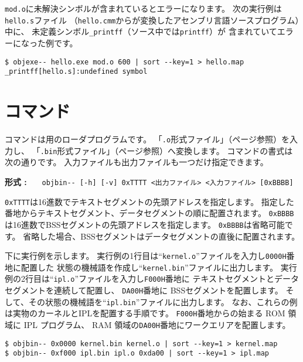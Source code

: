 \verb/mod.o/に未解決シンボルが含まれているとエラーになります。
次の実行例は\verb/hello.s/ファイル
（\verb/hello.cmm/から\cmmc が変換したアセンブリ言語ソースプログラム）中に、
未定義シンボル\verb/_printff/（\cmm ソース中では\verb/printff/）が
含まれていてエラーになった例です。

\begin{mylist}
\begin{verbatim}
$ objexe-- hello.exe mod.o 600 | sort --key=1 > hello.map
_printff[hello.s]:undefined symbol
\end{verbatim}
\end{mylist}

\section{{\objbin}コマンド}

{\objbin}コマンドは{\tac}用のローダプログラムです。
「\verb/.o/形式ファイル」（\pageref{app:oformat}ページ参照）を入力し、
「\verb/.bin/形式ファイル」（\pageref{app:bformat}ページ参照）へ変換します。
{\objbin}コマンドの書式は次の通りです。
入力ファイルも出力ファイルも一つだけ指定できます。

\begin{flushleft}
{\bf 形式 : }~~~\verb/objbin-- [-h] [-v] 0xTTTT <出力ファイル> <入力ファイル> [0xBBBB]/
\end{flushleft}

\verb/0xTTTT/は16進数でテキストセグメントの先頭アドレスを指定します。
指定した番地からテキストセグメント、データセグメントの順に配置されます。
\verb/0xBBBB/は16進数でBSSセグメントの先頭アドレスを指定します。
\verb/0xBBBB/は省略可能です。
省略した場合、BSSセグメントはデータセグメントの直後に配置されます。

下に実行例を示します。
実行例の1行目は``\verb/kernel.o/''ファイルを入力し\verb/0000H/番地に配置した
状態の機械語を作成し``\verb/kernel.bin/''ファイルに出力します。
実行例の2行目は``\verb/ipl.o/''ファイルを入力し\verb/F000H/番地に
テキストセグメントとデータセグメントを連続して配置し、
\verb/DA00H/番地に BSSセグメントを配置します。
そして、その状態の機械語を``\verb/ipl.bin/''ファイルに出力します。
なお、これらの例は実物のカーネルとIPLを配置する手順です。
\verb/F000H/番地からの始まる ROM 領域に IPL プログラム、
RAM 領域の\verb/DA00H/番地にワークエリアを配置します。

\begin{mylist}
\begin{verbatim}
$ objbin-- 0x0000 kernel.bin kernel.o | sort --key=1 > kernel.map
$ objbin-- 0xf000 ipl.bin ipl.o 0xda00 | sort --key=1 > ipl.map
\end{verbatim}
\end{mylist}

